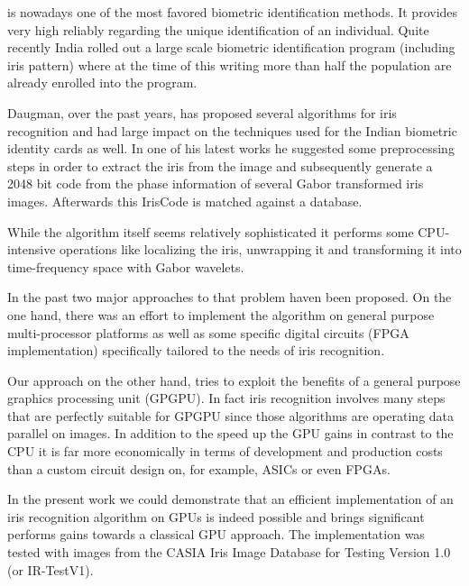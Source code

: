 \documentclass[journal]{IEEEtran}
\begin{document}
 is nowadays one of the most favored biometric identification methods. It provides very high reliably regarding the unique identification of an individual. Quite recently India rolled out a large scale biometric identification program (including iris pattern) where at the time of this writing more than half the population are already enrolled into the program. \cite{daugmanspie}
\par Daugman, over the past years, has proposed several algorithms for iris recognition and had large impact on the techniques used for the Indian biometric identity cards as well. In one of his latest works he suggested some preprocessing steps in order to extract the iris from the image and subsequently generate a 2048 bit code from the phase information of several Gabor transformed iris images. Afterwards this IrisCode is matched against a database. \cite{daugman2004iris}
\par While the algorithm itself seems relatively sophisticated it performs some CPU-intensive operations like localizing the iris, unwrapping it and transforming it into time-frequency space with Gabor wavelets.
\par In the past two major approaches to that problem haven been proposed. On the one hand, there was an effort to implement the algorithm on general purpose multi-processor platforms as well as some specific digital circuits (FPGA implementation) specifically tailored to the needs of iris recognition.\cite{6417657}
\par Our approach on the other hand, tries to exploit the benefits of a general purpose graphics processing unit (GPGPU). In fact iris recognition involves many steps that are perfectly suitable for GPGPU since those algorithms are operating data parallel on images. In addition to the speed up the GPU gains in contrast to the CPU it is far more economically in terms of development and production costs than a custom circuit design on, for example, ASICs or even FPGAs.
\par In the present work we could demonstrate that an efficient implementation of an iris recognition algorithm on GPUs is indeed possible and brings significant performs gains towards a classical GPU approach. The implementation was tested with images from the CASIA Iris Image Database for Testing Version 1.0 (or IR-TestV1). \cite{ir-testv1}
\end{document}
